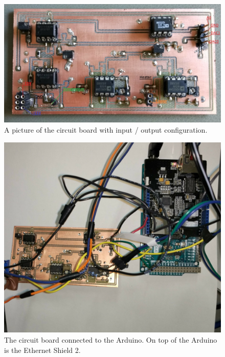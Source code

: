 \documentclass[12pt]{scrartcl}
\begin{document}
      \begin{figure}[H]
        \includegraphics[width = \textwidth]{boardbild.jpg}
        \caption{A picture of the circuit board with input / output configuration.}
        \label{fig5}
      \end{figure}
      \begin{figure}[H]
        \includegraphics[width = \textwidth]{boardwitharduino.jpg}
        \caption{The circuit board connected to the Arduino. On top of the
        Arduino is the Ethernet Shield 2. }
        \label{fig6}
      \end{figure}
\end{document}

